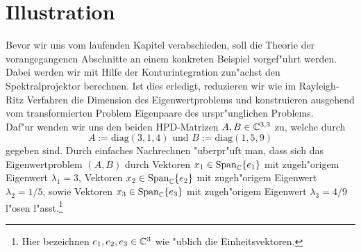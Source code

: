 \section{Illustration}\label{sec:bsp}

Bevor wir uns vom laufenden Kapitel verabschieden, soll die Theorie der vorangegangenen Abschnitte an einem konkreten Beispiel vorgef"uhrt werden. Dabei werden wir mit Hilfe der Konturintegration zun"achst den Spektralprojektor berechnen. Ist dies erledigt, reduzieren wir wie im Rayleigh-Ritz Verfahren die Dimension des Eigenwertproblems und konstruieren ausgehend vom transformierten Problem Eigenpaare des urspr"unglichen Problems.\\

Daf"ur wenden wir uns den beiden HPD-Matrizen
$A,B \in \mathbb{C}^{3,3}$ zu, welche durch
\[
A:= \text{diag}(3,1,4)\text{ und }
B:= \text{diag}(1,5,9)
\]
gegeben sind.
Durch einfaches Nachrechnen "uberpr"uft man, dass sich das Eigenwertproblem $(A,B)$ durch Vektoren
$x_1 \in \text{Span}_{\mathbb{C}}\{e_1\}$ mit zugeh"origem Eigenwert $\lambda_1 = 3$, Vektoren
$x_2 \in \text{Span}_{\mathbb{C}}\{e_2\}$ mit zugeh"origem Eigenwert $\lambda_2 = 1/5$, sowie
Vektoren $x_3 \in\text{Span}_{\mathbb{C}}\{e_3\}$ mit zugeh"origem Eigenwert $\lambda_3 = 4/9$
l"osen l"asst.\footnote{Hier bezeichnen $e_1, e_2, e_3 \in\mathbb{C}^3$ wie "ublich die Einheitsvektoren.}\\

